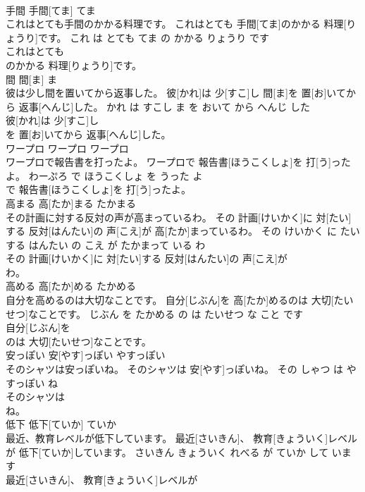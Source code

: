 \documentclass[8pt]{extreport}
\begin{document}
\begin{CJK}{UTF8}{min}
\\	手間	手間[てま]	てま	
\\	これはとても手間のかかる料理です。	これはとても 手間[てま]のかかる 料理[りょうり]です。	これ は とても てま の かかる りょうり です	
\\	これはとても
\\	のかかる 料理[りょうり]です。			
\\	間	間[ま]	ま	
\\	彼は少し間を置いてから返事した。	彼[かれ]は 少[すこ]し 間[ま]を 置[お]いてから 返事[へんじ]した。	かれ は すこし ま を おいて から へんじ した	
\\	彼[かれ]は 少[すこ]し
\\	を 置[お]いてから 返事[へんじ]した。			
\\	ワープロ	ワープロ	ワープロ	
\\	ワープロで報告書を打ったよ。	ワープロで 報告書[ほうこくしょ]を 打[う]ったよ。	わーぷろ で ほうこくしょ を うった よ	
\\	で 報告書[ほうこくしょ]を 打[う]ったよ。			
\\	高まる	高[たか]まる	たかまる	
\\	その計画に対する反対の声が高まっているわ。	その 計画[けいかく]に 対[たい]する 反対[はんたい]の 声[こえ]が 高[たか]まっているわ。	その けいかく に たいする はんたい の こえ が たかまって いる わ	
\\	その 計画[けいかく]に 対[たい]する 反対[はんたい]の 声[こえ]が
\\	わ。			
\\	高める	高[たか]める	たかめる	
\\	自分を高めるのは大切なことです。	自分[じぶん]を 高[たか]めるのは 大切[たいせつ]なことです。	じぶん を たかめる の は たいせつ な こと です	
\\	自分[じぶん]を
\\	のは 大切[たいせつ]なことです。			
\\	安っぽい	安[やす]っぽい	やすっぽい	
\\	そのシャツは安っぽいね。	そのシャツは 安[やす]っぽいね。	その しゃつ は やすっぽい ね	
\\	そのシャツは
\\	ね。			
\\	低下	低下[ていか]	ていか	
\\	最近、教育レベルが低下しています。	最近[さいきん]、 教育[きょういく]レベルが 低下[ていか]しています。	さいきん きょういく れべる が ていか して います	
\\	最近[さいきん]、 教育[きょういく]レベルが

\end{CJK}
\end{document}
